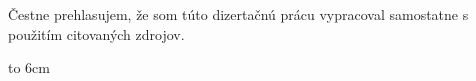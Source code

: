{~}\vspace{12cm}

\begin{minipage}{0.25\textwidth}~\end{minipage}
\begin{minipage}{0.69\textwidth}
Čestne prehlasujem, že som túto dizertačnú prácu vypracoval samostatne s použitím citovaných zdrojov.

\bigskip\bigskip

\hfill\hbox to 6cm{\dotfill}
\end{minipage}
